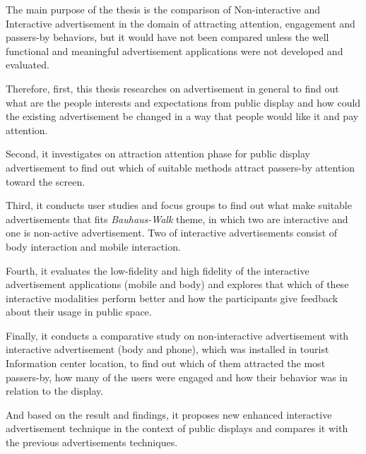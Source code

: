 The main purpose of the thesis is the comparison of Non-interactive and Interactive advertisement in the domain of attracting attention, engagement and passers-by behaviors, but it would have not been compared unless the well functional and meaningful advertisement applications were not developed and evaluated. 

Therefore, first, this thesis researches on advertisement in general to find out what are the people interests and expectations from public display and how could the existing advertisement be changed in a way that people would like it and pay attention.

Second, it investigates on attraction attention phase for public display advertisement to find out which of suitable methods attract passers-by attention toward the screen.

Third, it conducts user studies and focus groups to find out what make suitable advertisements that fits \emph{Bauhaus-Walk} theme, in which two are interactive and one is non-active advertisement. Two of interactive advertisements consist of body interaction and mobile interaction.

Fourth, it evaluates the low-fidelity and high fidelity of the interactive advertisement applications (mobile and body) and explores that which of these interactive modalities perform better and how the participants give feedback about their usage in public space.

Finally, it conducts a comparative study on non-interactive advertisement with interactive advertisement (body and phone), which was installed in tourist Information center location, to find out which of them attracted the most passers-by, how many of the users were engaged and how their behavior was in relation to the display.

And based on the result and findings, it proposes new enhanced interactive advertisement technique in the context of public displays and compares it with the previous advertisements techniques.



